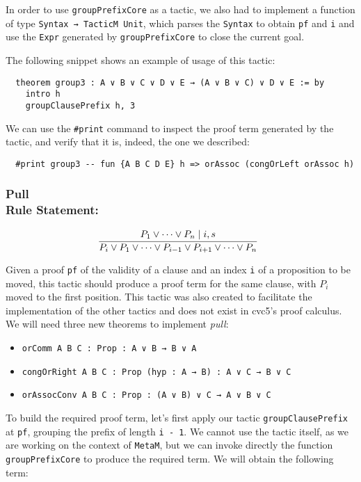 In order to use \texttt{groupPrefixCore} as a tactic, we also had to implement
a function of type \texttt{Syntax → TacticM Unit}, which parses the \texttt{Syntax}
to obtain \texttt{pf} and \texttt{i} and use the \texttt{Expr} generated by
\texttt{groupPrefixCore} to close the current goal.

The following snippet shows an example of usage of this tactic:

\begin{verbatim}
  theorem group3 : A ∨ B ∨ C ∨ D ∨ E → (A ∨ B ∨ C) ∨ D ∨ E := by
    intro h
    groupClausePrefix h, 3
\end{verbatim}

We can use the \texttt{\#print} command to inspect the proof term generated by the tactic, and
verify that it is, indeed, the one we described:

\begin{verbatim}
  #print group3 -- fun {A B C D E} h => orAssoc (congOrLeft orAssoc h)
\end{verbatim}


\subsubsection*{Pull\\Rule Statement:}
\[
  \infer[]{P_{i} \vee P_{1} \vee \cdots \vee P_{i - 1} \vee P_{i + 1} \vee \cdots \vee P_{n}}{P_{1} \vee \cdots \vee P_{n}  \mid i, s}
\]

Given a proof \texttt{pf} of the validity of a clause and an index \texttt{i} of a proposition to be moved, this tactic should produce a proof term for the same clause,
with $P_{i}$ moved to the first position. This tactic was also created to facilitate the implementation
of the other tactics and does not exist in cvc5's proof calculus. We will need three new theorems to implement \textit{pull}:

\begin{itemize}
  \item \texttt{orComm {A B C : Prop} : A ∨ B → B ∨ A}
  \item \texttt{congOrRight {A B C : Prop} (hyp : A → B) : A ∨ C → B ∨ C}
  \item \texttt{orAssocConv {A B C : Prop} : (A ∨ B) ∨ C → A ∨ B ∨ C}
\end{itemize}

To build the required proof term, let's first apply our tactic \texttt{groupClausePrefix} at \texttt{pf}, grouping the prefix of length \texttt{i - 1}.
We cannot use the tactic itself, as we are working on the context of \texttt{MetaM}, but we can invoke directly the function \texttt{groupPrefixCore}
to produce the required term. We will obtain the following term:

